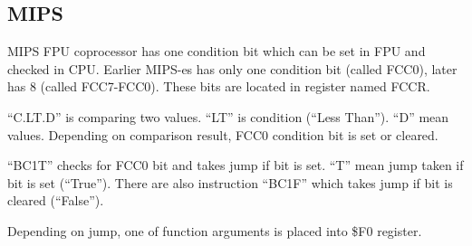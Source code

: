 \ifx\RUSSAIN\undefined
\subsection{MIPS}

MIPS FPU coprocessor has one condition bit which can be set in FPU and checked in CPU.
Earlier MIPS-es has only one condition bit (called FCC0), later has 8 (called FCC7-FCC0).
These bits are located in register named FCCR.



``C.LT.D'' is comparing two values. ``LT'' is condition (``Less Than''). ``D'' mean \Tdouble values.
Depending on comparison result, FCC0 condition bit is set or cleared.

``BC1T'' checks for FCC0 bit and takes jump if bit is set. ``T'' mean jump taken if bit is set (``True'').
There are also instruction ``BC1F'' which takes jump if bit is cleared (``False'').

Depending on jump, one of function arguments is placed into \$F0 register.

\fi
